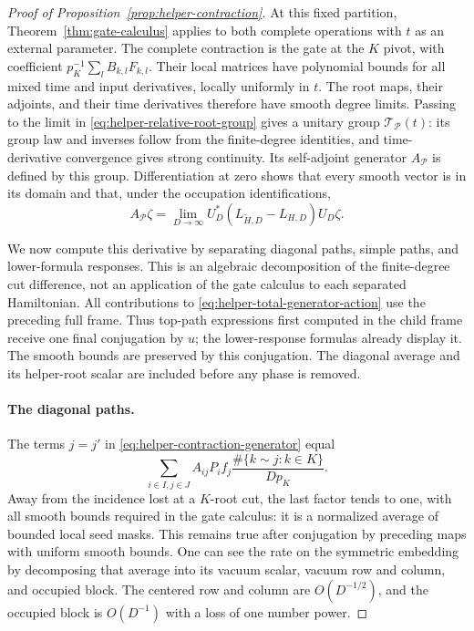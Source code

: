 \begin{proof}[Proof of Proposition~\ref{prop:helper-contraction}]
At this fixed partition, Theorem~\ref{thm:gate-calculus} applies to
both complete operations with \(t\) as an external parameter.  The
complete contraction is the gate at the \(K\) pivot, with coefficient
\(p_K^{-1}\sum_l B_{k,l}F_{k,l}\).  Their local matrices have polynomial bounds for all mixed time and input
derivatives, locally uniformly in \(t\).  The root maps, their adjoints,
and their time derivatives therefore have smooth degree limits.
Passing to the limit in \eqref{eq:helper-relative-root-group} gives a
unitary group \(\mathcal T_{\mathcal P}(t)\): its group law and
inverses follow from the finite-degree identities, and time-derivative
convergence gives strong continuity.  Its self-adjoint generator
\(A_{\mathcal P}\) is defined by this group.  Differentiation at zero
shows that every smooth vector is in its domain and that, under the
occupation identifications,
\begin{equation}\label{eq:helper-total-generator-action}
 A_{\mathcal P}\zeta
 =\lim_{D\to\infty}
 U_D^*(L_{\widetilde H,D}-L_{H,D})U_D\zeta.
\end{equation}

We now compute this derivative by separating diagonal paths, simple
paths, and lower-formula responses.  This is an algebraic decomposition
of the finite-degree cut difference, not an application of the gate
calculus to each separated Hamiltonian.  All contributions to
\eqref{eq:helper-total-generator-action} use the preceding full frame.
Thus top-path expressions first computed in the child frame receive
one final conjugation by \(u\); the lower-response formulas already
display it.  The smooth bounds are preserved by this conjugation.
The diagonal average and its helper-root scalar are included before
any phase is removed.

\paragraph{The diagonal paths.}
The terms \(j=j'\) in
\eqref{eq:helper-contraction-generator} equal
\begin{equation}
 \sum_{i\in I,j\in J}A_{ij}P_i f_j
       \frac{\#\{k\sim j:k\in K\}}{Dp_K}.
 \label{eq:diagonal-helper-paths}
\end{equation}
Away from the incidence lost at a \(K\)-root cut, the last factor
tends to one, with all smooth bounds required in the gate calculus:
it is a normalized average of bounded local seed masks.  This remains
true after conjugation by preceding maps with uniform smooth bounds.
One can see the rate on the symmetric embedding by decomposing that
average into its vacuum scalar, vacuum row and column, and occupied
block.  The centered row and column are \(O(D^{-1/2})\), and the
occupied block is \(O(D^{-1})\) with a loss of one number power.


\end{proof}
